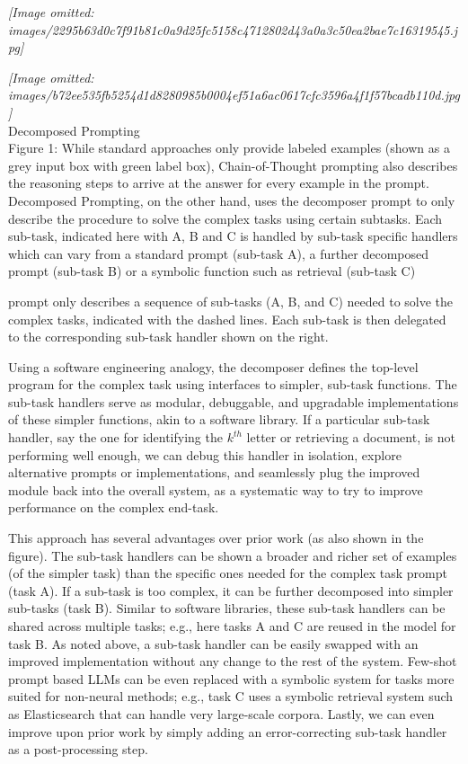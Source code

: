\documentclass[
]{article}
\begin{document}
\textit{[Image omitted: images/2295b63d0c7f91b81c0a9d25fc5158c4712802d43a0a3c50ea2bae7c16319545.jpg]}

\textit{[Image omitted: images/b72ee535fb5254d1d8280985b0004ef51a6ac0617cfc3596a4f1f57bcadb110d.jpg]}\\
Decomposed Prompting\\
Figure 1: While standard approaches only provide labeled examples (shown
as a grey input box with green label box), Chain-of-Thought prompting
also describes the reasoning steps to arrive at the answer for every
example in the prompt. Decomposed Prompting, on the other hand, uses the
decomposer prompt to only describe the procedure to solve the complex
tasks using certain subtasks. Each sub-task, indicated here with A, B
and C is handled by sub-task specific handlers which can vary from a
standard prompt (sub-task A), a further decomposed prompt (sub-task B)
or a symbolic function such as retrieval (sub-task C)

prompt only describes a sequence of sub-tasks (A, B, and C) needed to
solve the complex tasks, indicated with the dashed lines. Each sub-task
is then delegated to the corresponding sub-task handler shown on the
right.

Using a software engineering analogy, the decomposer defines the
top-level program for the complex task using interfaces to simpler,
sub-task functions. The sub-task handlers serve as modular, debuggable,
and upgradable implementations of these simpler functions, akin to a
software library. If a particular sub-task handler, say the one for
identifying the \(k^{th}\) letter or retrieving a document, is not
performing well enough, we can debug this handler in isolation, explore
alternative prompts or implementations, and seamlessly plug the improved
module back into the overall system, as a systematic way to try to
improve performance on the complex end-task.

This approach has several advantages over prior work (as also shown in
the figure). The sub-task handlers can be shown a broader and richer set
of examples (of the simpler task) than the specific ones needed for the
complex task prompt (task A). If a sub-task is too complex, it can be
further decomposed into simpler sub-tasks (task B). Similar to software
libraries, these sub-task handlers can be shared across multiple tasks;
e.g., here tasks A and C are reused in the model for task B. As noted
above, a sub-task handler can be easily swapped with an improved
implementation without any change to the rest of the system. Few-shot
prompt based LLMs can be even replaced with a symbolic system for tasks
more suited for non-neural methods; e.g., task C uses a symbolic
retrieval system such as Elasticsearch that can handle very large-scale
corpora. Lastly, we can even improve upon prior work by simply adding an
error-correcting sub-task handler as a post-processing step.
\end{document}
